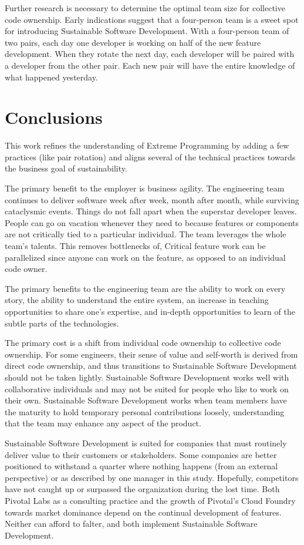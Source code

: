 \begin{table}[]
Further research is necessary to determine the optimal team size for collective code ownership. Early indications suggest that a four-person team is a sweet spot for introducing Sustainable Software Development. With a four-person team of two pairs, each day one developer is working on half of the new feature development. When they rotate the next day, each developer will be paired with a developer from the other pair. Each new pair will have the entire knowledge of what happened yesterday. 


\section{Conclusions}
This work refines the understanding of Extreme Programming by adding a few practices (like pair rotation) and aligns several of the technical practices towards the business goal of sustainability.

The primary benefit to the employer is business agility. The engineering team continues to deliver software week after week, month after month, while surviving cataclysmic events. Things do not fall apart when the superstar developer leaves. People can go on vacation whenever they need to because features or components are not critically tied to a particular individual. The team leverages the whole team's talents. This removes bottlenecks of,  Critical feature work can be parallelized since anyone can work on the feature, as opposed to an individual code owner. 

The primary benefits to the engineering team are the ability to work on every story, the ability to understand the entire system, an increase in teaching opportunities to share one's expertise, and in-depth opportunities to learn of the subtle parts of the technologies. 

The primary cost is a shift from individual code ownership to collective code ownership. For some engineers, their sense of value and self-worth is derived from direct code ownership, and thus transitions to Sustainable Software Development should not be taken lightly. Sustainable Software Development works well with collaborative individuals and may not be suited for people who like to work on their own. Sustainable Software Development works when team members have the maturity to hold temporary personal contributions loosely, understanding that the team may enhance any aspect of the product.

Sustainable Software Development is suited for companies that must routinely deliver value to their customers or stakeholders. Some companies are better positioned to withstand a quarter where nothing happens (from an external perspective) or   as described by one manager in this study. Hopefully, competitors have not caught up or surpassed the organization during the lost time. Both Pivotal Labs as a consulting practice and the growth of Pivotal's Cloud Foundry towards market dominance depend on the continual development of features. Neither can afford to falter, and both implement Sustainable Software Development.


\end{table}

